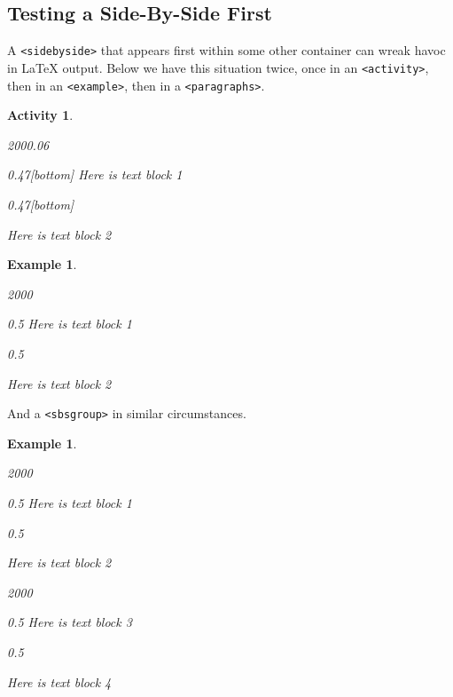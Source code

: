 \documentclass[pdflatex]{sn-jnl}
\theoremstyle{thmstyleone}%
\theoremstyle{thmstyletwo}%
\newtheorem{activity}[theorem]{Activity}
\newtheorem{example}[theorem]{Example}
\theoremstyle{thmstylethree}%
\newcommand{\mono}[1]{\texttt{#1}}
\numberwithin{equation}{section}
\begin{document}
\subsection{Testing a Side-By-Side First}\label{section-side-by-side-18}%
A \mono{<sidebyside>} that appears first within some other container can wreak havoc in \LaTeX{} output.  Below we have this situation twice, once in an \mono{<activity>}, then in an \mono{<example>}, then in a \mono{<paragraphs>}.%
\begin{activity}\label{section-side-by-side-18-3}%
%
\begin{sidebyside}{2}{0}{0}{0.06}%
\begin{sbspanel}{0.47}[bottom]%
Here is text block 1%
\end{sbspanel}%
\begin{sbspanel}{0.47}[bottom]%
\par
Here is text block 2%
\end{sbspanel}%
\end{sidebyside}%
\end{activity}%
\begin{example}\label{section-side-by-side-18-4}%
%
\begin{sidebyside}{2}{0}{0}{0}%
\begin{sbspanel}{0.5}%
Here is text block 1%
\end{sbspanel}%
\begin{sbspanel}{0.5}%
\par
Here is text block 2%
\end{sbspanel}%
\end{sidebyside}%
\end{example}
And a \mono{<sbsgroup>} in similar circumstances.%
\begin{example}\label{section-side-by-side-18-6}%
%
\begin{sidebyside}{2}{0}{0}{0}%
\begin{sbspanel}{0.5}%
Here is text block 1%
\end{sbspanel}%
\begin{sbspanel}{0.5}%
\par
Here is text block 2%
\end{sbspanel}%
\end{sidebyside}%
\begin{sidebyside}{2}{0}{0}{0}%
\begin{sbspanel}{0.5}%
Here is text block 3%
\end{sbspanel}%
\begin{sbspanel}{0.5}%
\par
Here is text block 4%
\end{sbspanel}%
\end{sidebyside}%
\end{example}
\end{document}
